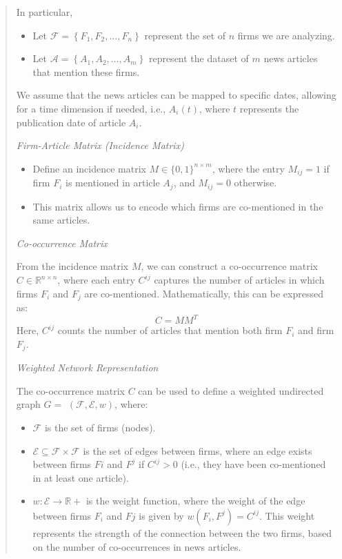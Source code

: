 \begin{quote}
In particular, 
\begin{itemize}
  \item Let $\mathcal{F}=\left\{F_1, F_2, \ldots, F_n\right\}$ represent the set of $n$ firms we are analyzing.
  \item Let $\mathcal{A}=\left\{A_1, A_2, \ldots, A_m\right\}$ represent the dataset of $m$ news articles that mention these firms.
\end{itemize}
We assume that the news articles can be mapped to specific dates, allowing for a time dimension if needed, i.e., $A_i(t)$, where $t$ represents the publication date of article $A_i$.

\textit{Firm-Article Matrix (Incidence Matrix)}

\begin{itemize}
  \item Define an incidence matrix $M \in\{0,1\}^{n \times m}$, where the entry $M_{i j}=1$ if firm $F_i$ is mentioned in article $A_j$, and $M_{i j}=0$ otherwise.
  \item This matrix allows us to encode which firms are co-mentioned in the same articles.
\end{itemize}

\textit{Co-occurrence Matrix}

From the incidence matrix $M$, we can construct a co-occurrence matrix $C \in \mathbb{R}^{n \times n}$, where each entry $C^{i j}$ captures the number of articles in which firms $F_i$ and $F_j$ are co-mentioned.
Mathematically, this can be expressed as:
$$
C=M M^T
$$
Here, $C^{i j}$ counts the number of articles that mention both firm $F_i$ and firm $F_j$.


\textit{Weighted Network Representation}

The co-occurrence matrix $C$ can be used to define a weighted undirected graph $G=$ $(\mathcal{F}, \mathcal{E}, w)$, where:
\begin{itemize}
  \item $\mathcal{F}$ is the set of firms (nodes).
  \item $\mathcal{E} \subseteq \mathcal{F} \times \mathcal{F}$ is the set of edges between firms, where an edge exists between firms $F i$ and $F^j$ if $C^{i j}>0$ (i.e., they have been co-mentioned in at least one article).
  \item $w: \mathcal{E} \rightarrow \mathbb{R}+$ is the weight function, where the weight of the edge between firms $F_i$ and $F j$ is given by $w\left(F_i, F^j\right)=C^{i j}$. This weight represents the strength of the connection between the two firms, based on the number of co-occurrences in news articles.
\end{itemize}

\end{quote}




